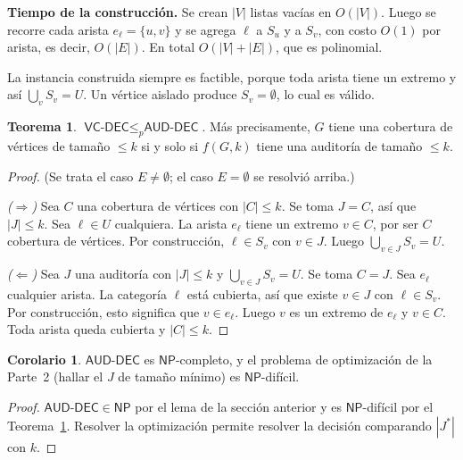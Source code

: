 \documentclass[11pt,a4paper]{article}
\theoremstyle{definition}
\newtheorem{teorema}[definicion]{Teorema}
\newtheorem{corolario}[definicion]{Corolario}
\newcommand{\AUD}{\textsf{AUD-DEC}}
\newcommand{\VC}{\textsf{VC-DEC}}
\newcommand{\NP}{\mathsf{NP}}
\newcommand{\pol}{\le_p}
\begin{document}
\textbf{Tiempo de la construcción.} Se crean $|V|$ listas vacías en $O(|V|)$. Luego se recorre cada arista $e_\ell=\{u,v\}$ y se agrega $\ell$ a $S_u$ y a $S_v$, con costo $O(1)$ por arista, es decir, $O(|E|)$. En total $O(|V|+|E|)$, que es polinomial.

La instancia construida siempre es factible, porque toda arista tiene un extremo y así $\bigcup_v S_v=U$. Un vértice aislado produce $S_v=\emptyset$, lo cual es válido.

\begin{teorema}\label{teo:p2}
$\VC\pol\AUD$. Más precisamente, $G$ tiene una cobertura de vértices de tamaño $\le k$ si y solo si $f(G,k)$ tiene una auditoría de tamaño $\le k$.
\end{teorema}
\begin{proof}
(Se trata el caso $E\neq\emptyset$; el caso $E=\emptyset$ se resolvió arriba.)

\emph{($\Rightarrow$)} Sea $C$ una cobertura de vértices con $|C|\le k$. Se toma $J=C$, así que $|J|\le k$. Sea $\ell\in U$ cualquiera. La arista $e_\ell$ tiene un extremo $v\in C$, por ser $C$ cobertura de vértices. Por construcción, $\ell\in S_v$ con $v\in J$. Luego $\bigcup_{v\in J}S_v=U$.

\emph{($\Leftarrow$)} Sea $J$ una auditoría con $|J|\le k$ y $\bigcup_{v\in J}S_v=U$. Se toma $C=J$. Sea $e_\ell$ cualquier arista. La categoría $\ell$ está cubierta, así que existe $v\in J$ con $\ell\in S_v$. Por construcción, esto significa que $v\in e_\ell$. Luego $v$ es un extremo de $e_\ell$ y $v\in C$. Toda arista queda cubierta y $|C|\le k$.
\end{proof}

\begin{corolario}
$\AUD$ es $\NP$-completo, y el problema de optimización de la Parte~2 (hallar el $J$ de tamaño mínimo) es $\NP$-difícil.
\end{corolario}
\begin{proof}
$\AUD\in\NP$ por el lema de la sección anterior y es $\NP$-difícil por el Teorema~\ref{teo:p2}. Resolver la optimización permite resolver la decisión comparando $|J^*|$ con $k$.
\end{proof}
\end{document}
